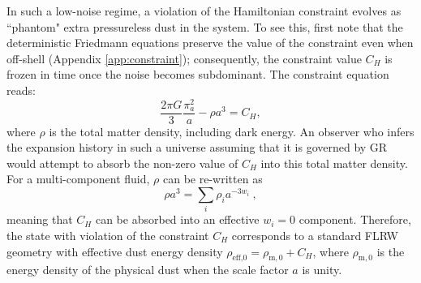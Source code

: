 \documentclass[amsmath,amssymb,11pt]{article}
\begin{document}
In such a low-noise regime, a violation of the Hamiltonian constraint evolves as “phantom" extra pressureless dust in the system. To see this, first note that the deterministic Friedmann equations preserve the value of the constraint even when off-shell (Appendix \ref{app:constraint}); consequently, the constraint value $C_H$ is frozen in time once the noise becomes subdominant. The constraint equation reads:
\begin{equation}
    \frac{2\pi G}{3}\frac{\pi_a^2}{a}-\rho a^3 = C_H,
\end{equation}
where $\rho$ is the total matter density, including dark energy. 
An observer who infers the expansion history in such a universe assuming that it is governed by GR would attempt to absorb the non-zero value of $C_H$ into this total matter density. For a multi-component fluid, $\rho$ can be re-written as
\begin{equation}
    \rho a^3 = \sum_i \rho_i a^{-3w_i} \ ,
\end{equation}
meaning that $C_H$ can be absorbed into an effective $w_i=0$ component. Therefore, the state with violation of the constraint $C_H$ corresponds to a standard FLRW geometry with effective dust energy density $\rho_\text{eff,0}=\rho_{\text{m},0}+C_H$, where $\rho_{\text{m},0}$ is the energy density of the physical dust when the scale factor $a$ is unity.
\end{document}

